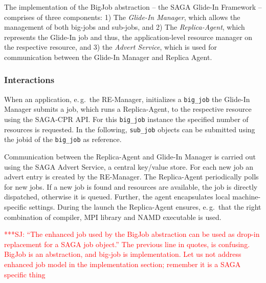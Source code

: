 \documentclass{rspublic}
\newcommand{\jhanote}[1]{ {\textcolor{red} { ***SJ: #1 }}}
\newcommand{\jhanote}[1]{}
\newcommand{\replicaagent}[1]{Replica-Agent }
\begin{document}
The implementation of the BigJob abstraction -- the SAGA Glide-In Framework --
comprises of three components: 1) The \emph{Glide-In Manager}, which
allows the management of both big-jobs and sub-jobs, and
2) The \emph{Replica-Agent}, which represents the Glide-In job and thus, 
the application-level resource manager 
on the respective resource, and 3) the \emph{Advert Service}, which is 
used for communication between the Glide-In Manager and Replica Agent.

  
\subsubsection{Interactions}            
When an application, e.\,g.\ the RE-Manager, initializes a \texttt{big\_job} 
the Glide-In Manager submits a job, which runs a Replica-Agent, 
to the respective resource using the SAGA-CPR API.  For this 
\texttt{big\_job} instance the specified number of resources 
is requested. In the following, \texttt{sub\_job} objects can 
be submitted using the jobid of the \texttt{big\_job} as reference.

Communication between the Replica-Agent and Glide-In
Manager is carried out using the SAGA Advert Service, a central
key/value store. For each new job an advert entry is created by the
RE-Manager. The \replicaagent\ periodically polls for new jobs.  If a
new job is found and resources are available, the job is directly dispatched,
otherwise it is queued. Further, the agent encapsulates local machine-specific
settings. During the launch the \replicaagent\ ensures, e.\,g.\ 
that the right combination of compiler, MPI library and NAMD 
executable is used.                

\jhanote{``The enhanced job
  used by the BigJob abstraction can be used as drop-in replacement
  for a SAGA job object.'' The previous line in quotes, is
  confusing. BigJob is an abstraction, and big-job is
  implementation. Let us not address enhanced job model in the
  implementation section; remember it is a SAGA specific thing}
\end{document}
